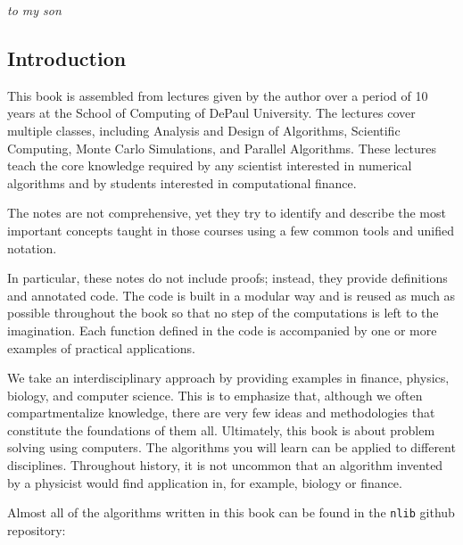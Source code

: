 \documentclass[justified, sixbynine]{tufte-book}
\def\ft{\small\tt}
\theoremstyle{plain}%
\newtheorem * {corollary}{Corollary}
\theoremstyle{definition}
\theoremstyle{remark}
\newtheorem * {remark}{Remark}
\newtheorem * {note}{Note}
\begin{document}
\newpage
\thispagestyle{empty}
\phantom{placeholder}
\vspace{2in}
\hskip 2in
{\it to my son}
\newpage
\thispagestyle{empty}
\phantom {a}
\newpage

\setlength{\cftparskip}{\baselineskip}
\tableofcontents

\mainmatter
\begin{fullwidth}

\goodbreak\chapter{Introduction}

This book is assembled from lectures given by the author over a period of 10 years at the School of Computing of DePaul University. The lectures cover multiple classes, including Analysis and Design of Algorithms, Scientific Computing, Monte Carlo Simulations, and Parallel Algorithms. These lectures teach the core knowledge required by any scientist interested in numerical algorithms and by students interested in computational finance.

The notes are not comprehensive, yet they try to identify and describe the most important concepts taught in those courses using a few common tools and unified notation.

In particular, these notes do not include proofs; instead, they provide definitions and annotated code. The code is built in a modular way and is reused as much as possible throughout the book so that no step of the computations is left to the imagination. Each function defined in the code is accompanied by one or more examples of practical applications.

We take an interdisciplinary approach by providing examples in finance, physics, biology, and computer science. This is to emphasize that, although we often compartmentalize knowledge, there are very few ideas and methodologies that constitute the foundations of them all. Ultimately, this book is about problem solving using computers. The algorithms you will learn can be applied to different disciplines. Throughout history, it is not uncommon that an algorithm invented by a physicist would find application in, for example, biology or finance.

Almost all of the algorithms written in this book can be found in the {\ft nlib} github repository:


\end{fullwidth}
\end{document}
